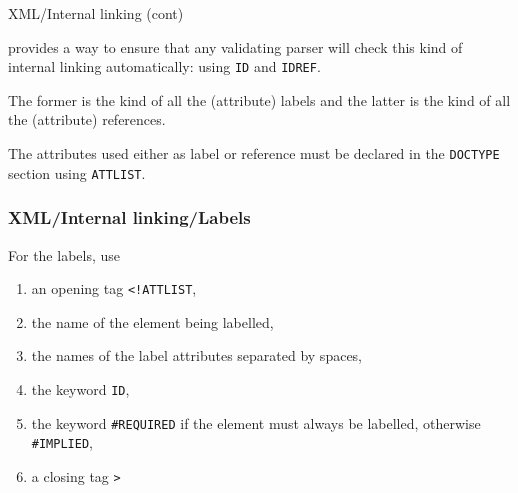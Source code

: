 %
\begin{frame}{XML/Internal linking (cont)}
\label{xml_intro:ATTLIST}

\XML provides a way to ensure that any validating parser will check
this kind of internal linking automatically: using \texttt{ID} and
\texttt{IDREF}.

\bigskip

The former is the kind of all the (attribute) labels and the latter is
the kind of all the (attribute) references.

\bigskip

The attributes used either as label or reference must be declared in
the \texttt{DOCTYPE} section using \texttt{ATTLIST}.

\end{frame}

%
\begin{frame}[containsverbatim]
\frametitle{XML/Internal linking/Labels}

For the labels, use
\begin{enumerate}

  \item an opening tag \verb|<!ATTLIST|,

  \item the name of the element being labelled,

  \item the names of the label attributes separated by spaces,

  \item the keyword \texttt{ID},

  \item the keyword \texttt{\#REQUIRED} if the element must always be
    labelled, otherwise \texttt{\#IMPLIED},

  \item a closing tag \verb|>|

\end{enumerate}

\end{frame}

